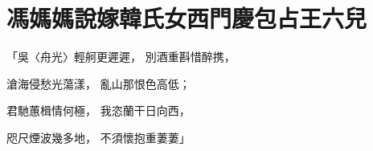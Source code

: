 %

\chapter{馮媽媽說嫁韓氏女\KG 西門慶包占王六兒}


\begin{showcontents}{}



「吳〈舟光〉輕舸更遲遲，  別酒重斟惜醉携，

滄海侵愁光蕩漾，  亂山那恨色高低；

君馳蕙楫情何極，  我恣蘭干日向西，

咫尺煙波幾多地，  不須懷抱重萋萋」


\end{showcontents}

